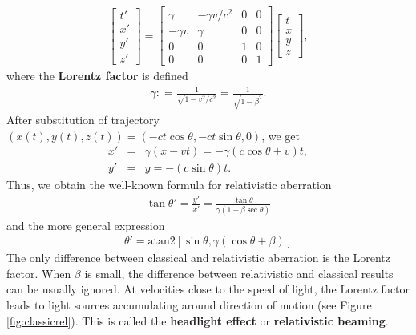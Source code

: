\documentclass [12pt, a4paper] {article}
\begin{document}
\begin {eqnarray}
    \begin {bmatrix}
        t' \\ x' \\ y' \\ z'
    \end {bmatrix}
    =
    \begin {bmatrix}
        \gamma & - \gamma v / c^2 & 0 & 0 \\ 
        -\gamma v & \gamma & 0 & 0  \\ 
        0 & 0 & 1 & 0 \\ 
        0 & 0 & 0 & 1
    \end {bmatrix}
    \begin {bmatrix}
        t \\ x \\ y \\ z
    \end {bmatrix},
\end {eqnarray}
where the \textbf{Lorentz factor} is defined
\begin {eqnarray}
    \gamma:
    = 
    \frac{1}{\sqrt{1 - v^2/c^2}}
    =
    \frac{1}{\sqrt{1 - \beta^2}}.
\end {eqnarray}
After substitution of trajectory 
$(x(t), y(t), z(t)) = (-ct\cos\theta, -ct\sin\theta, 0)$, we get
\begin {eqnarray}
    x' &=& \gamma(x - vt) 
    = -\gamma(c\cos\theta + v) t,
    \\
    y' &=& y = -(c\sin\theta)t.
\end {eqnarray}
Thus, we obtain the well-known formula for relativistic aberration
\begin {eqnarray}
    \label{eq:relativistic_aberration}
    \tan\theta' = \frac{y'}{x'} = \frac{\tan\theta}{\gamma(1 + \beta\sec\theta)}
\end {eqnarray}
and the more general expression
\begin {eqnarray}
    \label{eq:relativistic_aberration2}
    \theta' 
    =
    \textrm{atan2}\left[\sin\theta, \gamma(\cos\theta + \beta)\right]
\end {eqnarray}
The only difference between classical and relativistic aberration is the Lorentz 
factor. When $\beta$ is small, the difference between relativistic and classical 
results can be usually ignored. At velocities close to the speed of light, the 
Lorentz factor leads to light sources accumulating around direction of motion 
(see Figure \ref{fig:classicrel}). This is called the \textbf{headlight effect} or 
\textbf{relativistic beaming}.
\end{document}
